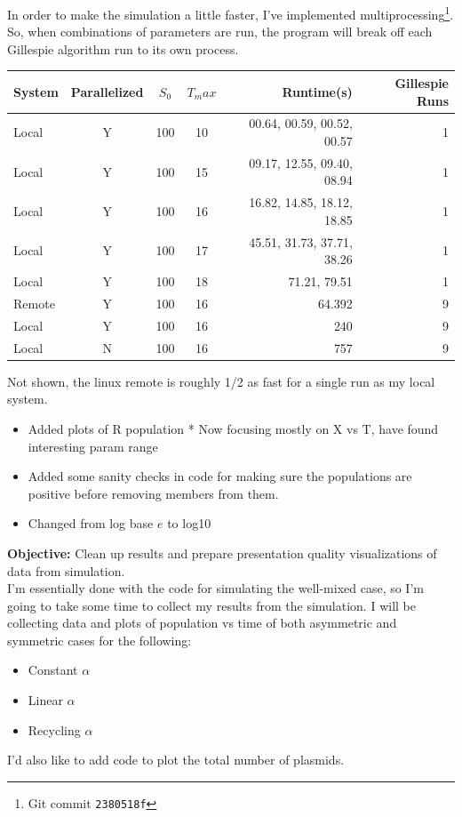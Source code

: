 \documentclass[oneside]{labbook}
\newcommand{\obj}[1]{\textbf{Objective:} #1\\}
\newcommand{\commit}[1]{\footnote{Git commit \texttt{#1}}}
\begin{document}
In order to make the simulation a little faster, I've implemented
multiprocessing\commit{2380518f}.
So, when combinations of parameters are run, the program will break off each
Gillespie algorithm run to its own process.\\

\begin{tabular}{l|c|c|c|r|r|}
  \hline
System & Parallelized & $S_0$ & $T_max$ & Runtime(s) & Gillespie Runs\\
\hline
Local & Y & 100 & 10 & 00.64, 00.59, 00.52, 00.57 & 1\\
Local & Y & 100 & 15 & 09.17, 12.55, 09.40, 08.94 & 1\\
Local & Y & 100 & 16 & 16.82, 14.85, 18.12, 18.85 & 1\\
Local & Y & 100 & 17 & 45.51, 31.73, 37.71, 38.26 & 1\\
Local & Y & 100 & 18 & 71.21, 79.51  & 1\\
\hline
Remote & Y & 100 & 16 & 64.392 & 9\\
Local & Y & 100 & 16 & 240 & 9\\
Local & N & 100 & 16 & 757 & 9\\
\hline
\end{tabular}

Not shown, the linux remote is roughly 1/2 as fast for a single run as my local
system.


\begin{itemize}
\item Added plots of R population
    * Now focusing mostly on X vs T, have found interesting param range
\item Added some sanity checks in code for making sure the populations are positive before
  removing members from them.
\item Changed from log base $e$ to log10
\end{itemize}


\obj{Clean up results and prepare presentation quality visualizations of
data from simulation.}

I'm essentially done with the code for simulating the well-mixed case, so I'm
going to take some time to collect my results from the simulation. I will be
collecting data and plots of population vs time of both asymmetric and symmetric
cases for the following:
\begin{itemize}
  \item Constant $\alpha$
  \item Linear $\alpha$
  \item Recycling $\alpha$
\end{itemize}
I'd also like to add code to plot the total number of plasmids.
\end{document}
